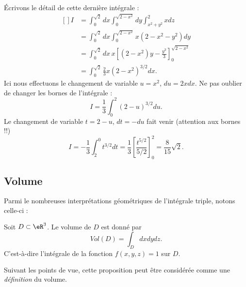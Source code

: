 \begin{example}
	Écrivons le détail de cette dernière intégrale :
	\begin{equation}
		\begin{aligned}[]
			I & =\int_0^{\sqrt{2}}dx\int_0^{\sqrt{2-x^2}}dy\int_{x^2+y^2}^2xdz                    \\
			  & =\int_0^{\sqrt{2}}dx\int_0^{\sqrt{2-x^2}}x(2-x^2-y^2)dy                           \\
			  & =\int_0^{\sqrt{2}}dx\,x\left[ (2-x^2)y-\frac{ y^3 }{ 3 } \right]_0^{\sqrt{2-x^2}} \\
			  & =\int_0^{\sqrt{2}}\frac{ 2 }{ 3 }x(2-x^2)^{3/2}dx.
		\end{aligned}
	\end{equation}
	Ici nous effectuons le changement de variable \( u=x^2\), \( du=2xdx\). Ne pas oublier de changer les bornes de l'intégrale :
	\begin{equation}
		I=\frac{1}{ 3 }\int_0^2(2-u)^{3/2}du.
	\end{equation}
	Le changement de variable \( t=2-u\), \( dt=-du\) fait venir (attention aux bornes !!)
	\begin{equation}
		I=-\frac{1}{ 3 }\int_2^0t^{3/2}dt=\frac{1}{ 3 }\left[ \frac{ t^{5/2} }{ 5/2 } \right]_0^2=\frac{ 8 }{ 15 }\sqrt{2}.
	\end{equation}

\end{example}

\subsection{Volume}

Parmi le nombreuses interprétations géométriques de l'intégrale triple, notons celle-ci :
\begin{proposition}
	Soit \( D\subset \eR^3\). Le volume de \( D\) est donné par
	\begin{equation}
		Vol(D)=\int_D dxdydz.
	\end{equation}
	C'est-à-dire l'intégrale de la fonction \( f(x,y,z)=1\) sur \( D\).
\end{proposition}
Suivant les points de vue, cette proposition peut être considérée comme une \emph{définition} du volume.

